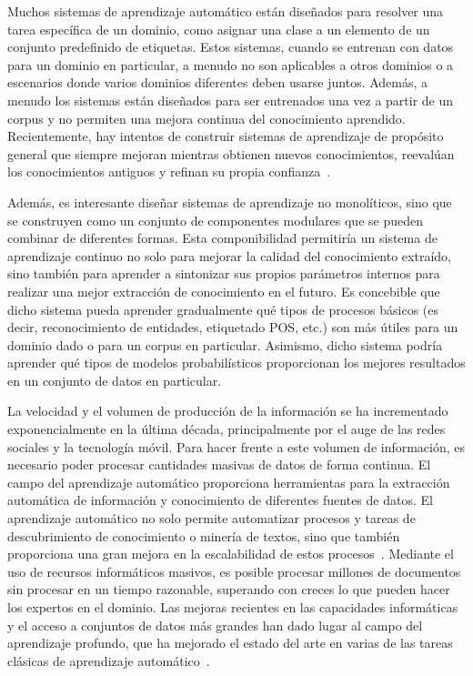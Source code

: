 Muchos sistemas de aprendizaje automático están diseñados para resolver una tarea específica de un dominio, como asignar una clase a un elemento de un conjunto predefinido de etiquetas. Estos sistemas, cuando se entrenan con datos para un dominio en particular, a menudo no son aplicables a otros dominios o a escenarios donde varios dominios diferentes deben usarse juntos. Además, a menudo los sistemas están diseñados para ser entrenados una vez a partir de un corpus y no permiten una mejora continua del conocimiento aprendido. Recientemente, hay intentos de construir sistemas de aprendizaje de propósito general que siempre mejoran mientras obtienen nuevos conocimientos, reevalúan los conocimientos antiguos y refinan su propia confianza~\cite{mitchell2015never}.

Además, es interesante diseñar sistemas de aprendizaje no monolíticos, sino que se construyen como un conjunto de componentes modulares que se pueden combinar de diferentes formas. Esta componibilidad permitiría un sistema de aprendizaje continuo no solo para mejorar la calidad del conocimiento extraído, sino también para aprender a sintonizar sus propios parámetros internos para realizar una mejor extracción de conocimiento en el futuro. Es concebible que dicho sistema pueda aprender gradualmente qué tipos de procesos básicos (es decir, reconocimiento de entidades, etiquetado POS, etc.) son más útiles para un dominio dado o para un corpus en particular. Asimismo, dicho sistema podría aprender qué tipos de modelos probabilísticos proporcionan los mejores resultados en un conjunto de datos en particular.

La velocidad y el volumen de producción de la información se ha incrementado exponencialmente en la última década, principalmente por el auge de las redes sociales y la tecnología móvil. Para hacer frente a este volumen de información, es necesario poder procesar cantidades masivas de datos de forma continua. El campo del aprendizaje automático proporciona herramientas para la extracción automática de información y conocimiento de diferentes fuentes de datos. El aprendizaje automático no solo permite automatizar procesos y tareas de descubrimiento de conocimiento o minería de textos, sino que también proporciona una gran mejora en la escalabilidad de estos procesos~\cite{wu2014data}. Mediante el uso de recursos informáticos masivos, es posible procesar millones de documentos sin procesar en un tiempo razonable, superando con creces lo que pueden hacer los expertos en el dominio. Las mejoras recientes en las capacidades informáticas y el acceso a conjuntos de datos más grandes han dado lugar al campo del aprendizaje profundo, que ha mejorado el estado del arte en varias de las tareas clásicas de aprendizaje automático~\cite{lecun2015deep}.

